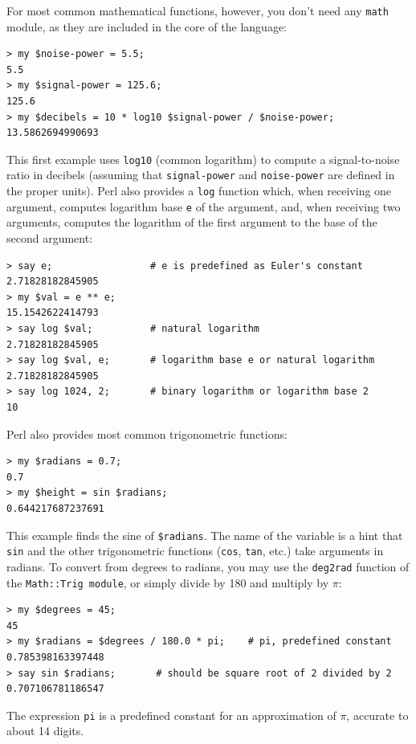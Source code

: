 For most common mathematical functions, however, you don't need any \verb'math' module, as they are included in the core of the language:

\begin{verbatim}
> my $noise-power = 5.5;
5.5
> my $signal-power = 125.6;
125.6
> my $decibels = 10 * log10 $signal-power / $noise-power;
13.5862694990693
\end{verbatim}
%
This first example uses \verb"log10" (common logarithm) 
to compute a signal-to-noise ratio in decibels 
(assuming that \verb"signal-power" and
\verb"noise-power" are defined in the proper units).  Perl 
also provides a {\tt log} function which, when receiving 
one argument, computes logarithm base {\tt e} of the argument, 
and, when receiving two arguments, computes the logarithm 
of the first argument to the base of the second argument:

\begin{verbatim}
> say e;                 # e is predefined as Euler's constant
2.71828182845905
> my $val = e ** e;
15.1542622414793
> say log $val;          # natural logarithm
2.71828182845905
> say log $val, e;       # logarithm base e or natural logarithm
2.71828182845905
> say log 1024, 2;       # binary logarithm or logarithm base 2
10
\end{verbatim}
%


Perl also provides most common trigonometric functions:

\begin{verbatim}
> my $radians = 0.7;
0.7
> my $height = sin $radians;
0.644217687237691
\end{verbatim}

This example finds the sine of \verb'$radians'.  The name of the
variable is a hint that {\tt sin} and the other trigonometric
functions ({\tt cos}, {\tt tan}, etc.)  take arguments 
in radians. To convert from degrees to radians, you may 
use the  \verb'deg2rad' function of the 
\verb'Math::Trig module', or simply divide by 180 
and multiply by $\pi$:

\begin{verbatim}
> my $degrees = 45;
45
> my $radians = $degrees / 180.0 * pi;    # pi, predefined constant
0.785398163397448
> say sin $radians;       # should be square root of 2 divided by 2
0.707106781186547
\end{verbatim}
%
The expression {\tt pi} is a predefined constant for an
approximation of $\pi$, accurate to about 14 digits.

